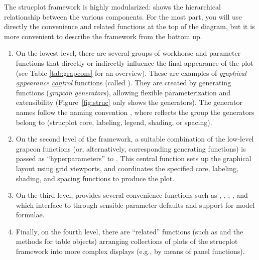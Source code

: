 \documentclass[10pt,krantz2]{krantz}\usepackage[]{graphicx}\usepackage[]{color}
\begin{document}
The strucplot framework is highly modularized: 
shows the hierarchical relationship between the various components.
For the most part, you will use directly the convenience and related
functions at the top of the diagram, but it is more convenient to
describe the framework from the bottom up.


\begin{enumerate}

\item On the lowest level, there are several groups of workhorse and
parameter functions that directly or indirectly influence the final
appearance of the plot (see Table \ref{tab:grapcons} for an overview).
These are examples of
\emph{\underline{gr}aphical \underline{ap}pearance \underline{con}trol} functions
(called ).
They are created by generating functions
(\emph{grapcon generators}), allowing
flexible parameterization and extensibility (Figure~\ref{fig:struc}
only shows the generators). The generator names
follow the naming convention ,
where  reflects the group the
generators belong to (strucplot core, labeling,
legend, shading, or spacing).

\item On the second level of the framework, a suitable combination
of the low-level grapcon functions (or, alternatively, corresponding generating functions)
is passed as ``hyperparameters'' to .
This central function
sets up the graphical layout using grid viewports,
and coordinates the specified core, labeling, shading, and spacing functions to produce
the plot.

\item On the third level,  provides
several convenience functions such as ,
, , , and  which
interface to  through sensible parameter defaults
and support for model formulae.

\item Finally, on the fourth
level, there are ``related''  functions (such as 
and the  methods for table objects)
arranging collections of plots of the strucplot
framework into more complex displays (e.g., by means of panel functions).
\end{enumerate}
\end{document}
